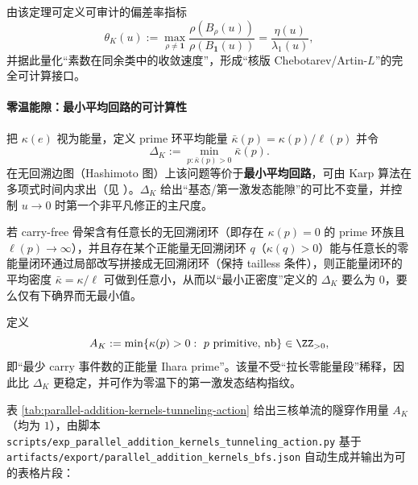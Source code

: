 由该定理可定义可审计的偏差率指标
\[
\theta_K(u):=\max_{\rho\neq\mathbf 1}\frac{\rho(B_\rho(u))}{\rho(B_{\mathbf 1}(u))}
=\frac{\eta(u)}{\lambda_1(u)},
\]
并据此量化“素数在同余类中的收敛速度”，形成“核版 Chebotarev/Artin-\(L\)”的完全可计算接口。

\paragraph{零温能隙：最小平均回路的可计算性}
把 $\kappa(e)$ 视为能量，定义 prime 环平均能量
\(
\bar\kappa(p)=\kappa(p)/\ell(p)
\)
并令
\[
\Delta_K:=\min_{p:\bar\kappa(p)>0}\bar\kappa(p).
\]
在无回溯边图（Hashimoto 图）上该问题等价于\textbf{最小平均回路}，可由 Karp 算法在多项式时间内求出（见 \cite{Karp1978MinCycleMean}）。$\Delta_K$ 给出“基态/第一激发态能隙”的可比不变量，并控制 $u\to 0$ 时第一个非平凡修正的主尺度。

\begin{proposition}[密度能隙的退化机制与隧穿作用量]\label{prop:ihara-gap-degeneracy}
若 carry-free 骨架含有任意长的无回溯闭环（即存在 \(\kappa(p)=0\) 的 prime 环族且 \(\ell(p)\to\infty\)），并且存在某个正能量无回溯闭环 \(q\)（\(\kappa(q)>0\)）能与任意长的零能量闭环通过局部改写拼接成无回溯闭环（保持 tailless 条件），则正能量闭环的平均密度 \(\bar\kappa=\kappa/\ell\) 可做到任意小，从而以“最小正密度”定义的 \(\Delta_K\) 要么为 \(0\)，要么仅有下确界而无最小值。
\end{proposition}

\begin{definition}\label{def:ihara-tunneling-action}
定义
$$
A_K:=\min\{\kappa(p)>0:\ p\ \text{primitive, nb}\}\in\ZZ_{>0},
$$
即“最少 carry 事件数的正能量 Ihara prime”。该量不受“拉长零能量段”稀释，因此比 \(\Delta_K\) 更稳定，并可作为零温下的第一激发态结构指纹。
\end{definition}

\begin{remark}\label{rem:ihara-AK-table}
表 \ref{tab:parallel-addition-kernels-tunneling-action} 给出三核单流的隧穿作用量 \(A_K\)（均为 \(1\)），由脚本
\texttt{scripts/exp\_parallel\_addition\_kernels\_tunneling\_action.py}
基于 \texttt{artifacts/export/parallel\_addition\_kernels\_bfs.json} 自动生成并输出为可 \verb|| 的表格片段：

\end{remark}

